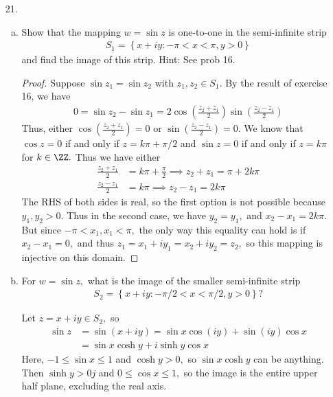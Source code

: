 \documentclass{article}
\begin{document}
\begin{itemize}
	\item[21.]
		\begin{enumerate}[(a)]
			\item Show that the mapping $w=\sin z$ is one-to-one in the semi-infinite strip
				\begin{align*}
					S_1 = \left\{ x+iy:-\pi<x<\pi, y>0 \right\}
				\end{align*}
				and find the image of this strip. Hint: See prob 16.
				\begin{proof}
					Suppose $\sin z_1 = \sin z_2$ with $z_1, z_2\in S_1.$ By the result of exercise 16, we have
					\begin{align*}
						0 = \sin z_2-\sin z_1 = 2\cos\left( \frac{z_2+z_1}{2} \right)\sin\left( \frac{z_2-z_1}{2} \right)
					\end{align*}
					Thus, either $\cos \left( \frac{z_2+z_1}{2} \right)=0$ or $\sin\left( \frac{z_2-z_1}{2} \right)=0.$ We know that $\cos z = 0$ if and only if $z=k\pi+\pi/2$ and $\sin z = 0$ if and only if $z=k\pi$ for $k\in\ZZ.$ Thus we have either
					\begin{align*}
						\frac{z_2+z_1}{2} &= k\pi+\frac{\pi}{2} \implies z_2+z_1 = \pi + 2k\pi \\
						\frac{z_2-z_1}{2} &= k\pi \implies z_2-z_1 = 2k\pi
					\end{align*}
					The RHS of both sides is real, so the first option is not possible because $y_1, y_2>0.$ Thus in the second case, we have $y_2=y_1,$ and $x_2-x_1=2k\pi.$ But since $-\pi<x_1, x_1<\pi,$ the only way this equality can hold is if $x_2-x_1=0,$ and thus $z_1=x_1+iy_1 = x_2 + iy_2 = z_2,$ so this mapping is injective on this domain.
				\end{proof}

			\item For $w=\sin z,$ what is the image of the smaller semi-infinite strip
				\begin{align*}
					S_2 = \left\{ x+iy:-\pi/2<x<\pi/2, y>0 \right\}?
				\end{align*}
				\begin{soln}
					Let $z=x+iy\in S_2,$ so
					\begin{align*}
						\sin z &= \sin\left( x+iy \right) = \sin x \cos (iy) + \sin(iy)\cos x \\
						&= \sin x \cosh y + i\sinh y\cos x
					\end{align*}
					Here, $-1\le \sin x\le 1$ and $\cosh y>0,$ so $\sin x\cosh y$ can be anything. Then $\sinh y>0j$ and $0\le \cos x\le 1,$ so the image is the entire upper half plane, excluding the real axis.
				\end{soln}

		\end{enumerate}

\end{itemize}
\end{document}
